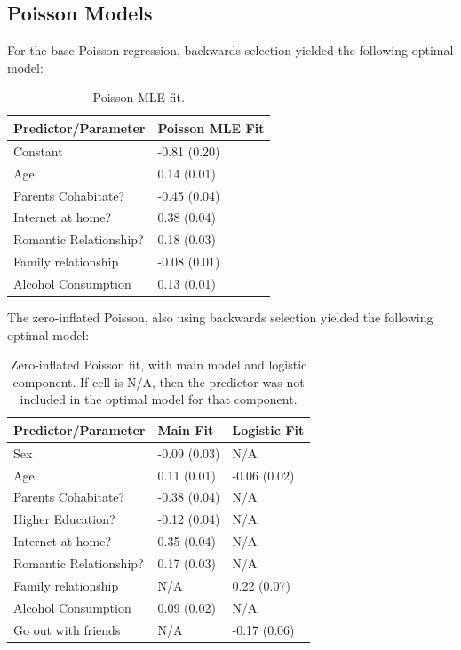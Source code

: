 \documentclass[12pt, titlepage]{article}
\begin{document}
	\subsection*{Poisson Models}
	For the base Poisson regression, backwards selection yielded the following optimal model:
	\begin{table}[h!]
		\centering
		\begin{tabular}{|l|l|}
			\hline
			Predictor/Parameter & Poisson MLE Fit  \\
			\hline 
			Constant & -0.81 (0.20) \\
			Age & 0.14 (0.01)  \\
			Parents Cohabitate? & -0.45 (0.04) \\
			Internet at home?& 0.38 (0.04)  \\
			Romantic Relationship?& 0.18 (0.03)  \\
			Family relationship & -0.08 (0.01) \\ 
			Alcohol Consumption & 0.13 (0.01) \\
			\hline
		\end{tabular}
		\caption{Poisson MLE fit.}
	\end{table}

	The zero-inflated Poisson, also using backwards selection yielded the following optimal model:
	
	\begin{table}[h!]
		\centering
		\begin{tabular}{|l|l|l|}
			\hline
			Predictor/Parameter & Main Fit & Logistic Fit  \\
			\hline 
			Sex & -0.09 (0.03) & N/A \\
			Age & 0.11 (0.01) & -0.06 (0.02)  \\
			Parents Cohabitate? & -0.38 (0.04) & N/A \\
			Higher Education? & -0.12 (0.04) & N/A  \\
			Internet at home?& 0.35 (0.04) & N/A \\
			Romantic Relationship?& 0.17 (0.03) & N/A  \\
			Family relationship & N/A & 0.22 (0.07) \\ 
			Alcohol Consumption & 0.09 (0.02) & N/A \\
			Go out with friends & N/A & -0.17 (0.06)\\
			\hline
		\end{tabular}
		\caption{Zero-inflated Poisson fit, with main model and logistic component. If cell is N/A, then the predictor was not included in the optimal model for that component.}
	\end{table}
\end{document}
